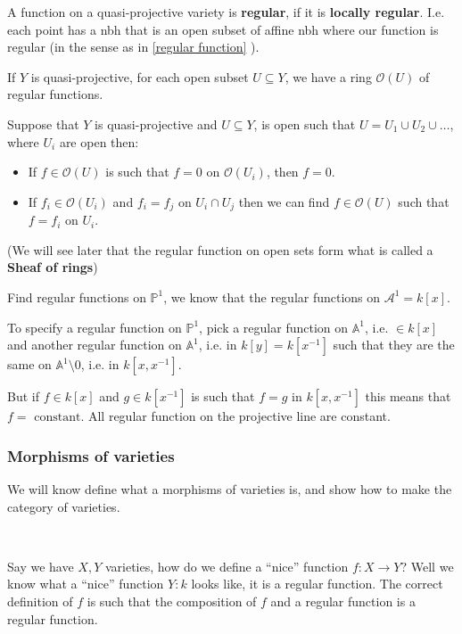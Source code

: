 \begin{definition}
    A function on a quasi-projective variety is \textbf{regular}, if it is \textbf{locally regular}. I.e. each point has a nbh that is an open subset of affine nbh where our function is regular (in the sense as in \ref{regular function} ).
    
    If $Y$ is quasi-projective, for each open subset $U\subseteq Y$, we have a ring $\mathcal{O}(U)$ of regular functions.
\end{definition}

\begin{theorem}\label{sheaf of rings}
    Suppose that $Y$ is quasi-projective and $U\subseteq Y$, is open such that $U = U_1\cup U_2\cup \ldots$, where $U_i$ are open then:\begin{itemize}
        \item If $f\in \mathcal{O}(U)$ is such that $f= 0$ on $\mathcal{O}(U_i)$, then $f = 0$.
        \item If $f_i\in \mathcal{O}(U_i)$ and $f_i=f_j$ on $U_i\cap U_j$ then we can find $f\in \mathcal{O}(U)$ such that $f = f_i$ on $U_i$.
    \end{itemize}
\end{theorem}
(We will see later that the regular function on open sets form what is called a \textbf{Sheaf of rings})

\begin{example}
    Find regular functions on $\mathbb{P}^1$, we know that the regular functions on $\mathcal{A}^1 = k[x]$. 

    To specify a regular function on $\mathbb{P}^1$, pick a regular function on $\mathbb{A}^1$, i.e. $\in k[x]$ and another regular function on $\mathbb{A}^1$, i.e. in $k[y]=k[x^{-1}]$ such that they are the same on $\mathbb{A}^1\setminus 0$, i.e. in $k[x,x^{-1}]$.

But if $f\in k[x]$ and $g\in k[x^{-1}]$ is such that $f = g$ in $k[x,x^{-1}]$ this means that $f = \text{ constant}$. All regular function on the projective line are constant.
\end{example}

\subsubsection{Morphisms of varieties}
We will know define what a morphisms of varieties is, and show how to make the category of varieties.

\

Say we have $X,Y$ varieties, how do we define a ``nice'' function $f\colon X\rightarrow Y$? Well we know what a ``nice'' function $Y\colon k$ looks like, it is a regular function. The correct definition of $f$ is such that the composition of $f$ and a regular function is a regular function.

